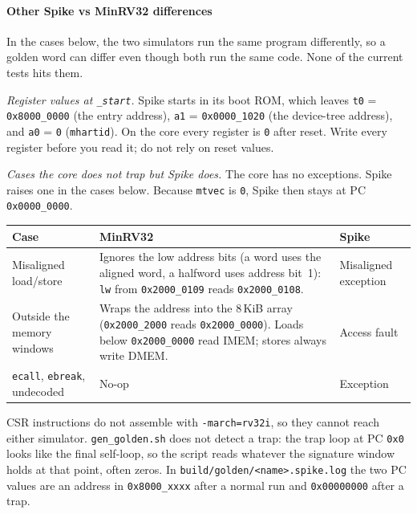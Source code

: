 \paragraph{Other Spike vs MinRV32 differences}
\label{sec:spike-other}
In the cases below, the two simulators run the same program differently, so a
golden word can differ even though both run the same code. None of the current tests hits
them.

\emph{Register values at \texttt{\_start}.} Spike starts in its boot ROM, which
leaves \texttt{t0} = \texttt{0x8000\_0000} (the entry address), \texttt{a1} =
\texttt{0x0000\_1020} (the device-tree address), and \texttt{a0} = \texttt{0}
(\texttt{mhartid}). On the core every register is \texttt{0} after reset. Write
every register before you read it; do not rely on reset values.

\emph{Cases the core does not trap but Spike does.} The core has no
exceptions. Spike raises one in the cases below. Because \texttt{mtvec} is
\texttt{0}, Spike then stays at PC \texttt{0x0000\_0000}.
\begin{center}
\begin{tabularx}{\linewidth}{@{}l X l@{}}
\toprule
Case & MinRV32 & Spike \\
\midrule
Misaligned load/store & Ignores the low address bits (a word uses the aligned
word, a halfword uses address bit~1): \texttt{lw} from \texttt{0x2000\_0109}
reads \texttt{0x2000\_0108}. & Misaligned exception \\
Outside the memory windows & Wraps the address into the 8\,KiB array
(\texttt{0x2000\_2000} reads \texttt{0x2000\_0000}). Loads below
\texttt{0x2000\_0000} read IMEM; stores always write DMEM. & Access fault \\
\texttt{ecall}, \texttt{ebreak}, undecoded & No-op & Exception \\
\bottomrule
\end{tabularx}
\end{center}
CSR instructions do not assemble with \texttt{-march=rv32i}, so they cannot
reach either simulator. \texttt{gen\_golden.sh} does not detect a trap: the
trap loop at PC \texttt{0x0} looks like the final self-loop, so the script
reads whatever the signature window holds at that point, often zeros. In
\texttt{build/golden/<name>.spike.log} the two PC values are an address in
\texttt{0x8000\_xxxx} after a normal run and \texttt{0x00000000} after a trap.

